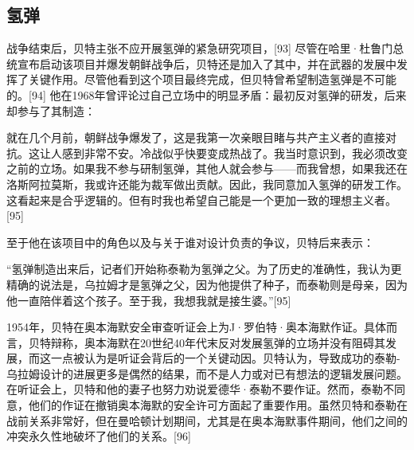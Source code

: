\subsection{氢弹}
战争结束后，贝特主张不应开展氢弹的紧急研究项目，[93] 尽管在哈里·杜鲁门总统宣布启动该项目并爆发朝鲜战争后，贝特还是加入了其中，并在武器的发展中发挥了关键作用。尽管他看到这个项目最终完成，但贝特曾希望制造氢弹是不可能的。[94] 他在1968年曾评论过自己立场中的明显矛盾：最初反对氢弹的研发，后来却参与了其制造：

就在几个月前，朝鲜战争爆发了，这是我第一次亲眼目睹与共产主义者的直接对抗。这让人感到非常不安。冷战似乎快要变成热战了。我当时意识到，我必须改变之前的立场。如果我不参与研制氢弹，其他人就会参与——而我曾想，如果我还在洛斯阿拉莫斯，我或许还能为裁军做出贡献。因此，我同意加入氢弹的研发工作。这看起来是合乎逻辑的。但有时我也希望自己能是一个更加一致的理想主义者。[95]

至于他在该项目中的角色以及与关于谁对设计负责的争议，贝特后来表示：

“氢弹制造出来后，记者们开始称泰勒为氢弹之父。为了历史的准确性，我认为更精确的说法是，乌拉姆才是氢弹之父，因为他提供了种子，而泰勒则是母亲，因为他一直陪伴着这个孩子。至于我，我想我就是接生婆。”[95]

1954年，贝特在奥本海默安全审查听证会上为J·罗伯特·奥本海默作证。具体而言，贝特辩称，奥本海默在20世纪40年代末反对发展氢弹的立场并没有阻碍其发展，而这一点被认为是听证会背后的一个关键动因。贝特认为，导致成功的泰勒-乌拉姆设计的进展更多是偶然的结果，而不是人力或对已有想法的逻辑发展问题。在听证会上，贝特和他的妻子也努力劝说爱德华·泰勒不要作证。然而，泰勒不同意，他们的作证在撤销奥本海默的安全许可方面起了重要作用。虽然贝特和泰勒在战前关系非常好，但在曼哈顿计划期间，尤其是在奥本海默事件期间，他们之间的冲突永久性地破坏了他们的关系。[96]
